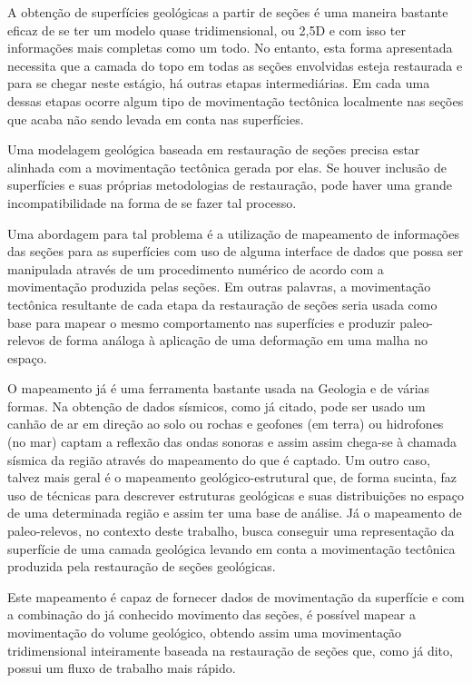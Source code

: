 A obtenção de superfícies geológicas a partir de seções é uma maneira bastante eficaz de se ter um modelo quase tridimensional, ou 2,5D e com isso ter informações mais completas como um todo. No entanto, esta forma apresentada necessita que a camada do topo em todas as seções envolvidas esteja restaurada e para se chegar neste estágio, há outras etapas intermediárias. Em cada uma dessas etapas ocorre algum tipo de movimentação tectônica localmente nas seções que acaba não sendo levada em conta nas superfícies.

Uma modelagem geológica baseada em restauração de seções precisa estar alinhada com a movimentação tectônica gerada por elas. Se houver inclusão de superfícies e suas próprias metodologias de restauração, pode haver uma grande incompatibilidade na forma de se fazer tal processo.

Uma abordagem para tal problema é a utilização de mapeamento de informações das seções para as superfícies com uso de alguma interface de dados que possa ser manipulada através de um procedimento numérico de acordo com a movimentação produzida pelas seções. Em outras palavras, a movimentação tectônica resultante de cada etapa da restauração de seções seria usada como base para mapear o mesmo comportamento nas superfícies e produzir paleo-relevos de forma análoga à aplicação de uma deformação em uma malha no espaço.

O mapeamento já é uma ferramenta bastante usada na Geologia e de várias formas. Na obtenção de dados sísmicos, como já citado, pode ser usado um canhão de ar em direção ao solo ou rochas e geofones (em terra) ou hidrofones (no mar) captam a reflexão das ondas sonoras e assim assim chega-se à chamada sísmica da região através do mapeamento do que é captado.\cite{Fossen} Um outro caso, talvez mais geral é o mapeamento geológico-estrutural que, de forma sucinta, faz uso de técnicas para descrever estruturas geológicas e suas distribuições no espaço de uma determinada região e assim ter uma base de análise.\cite{Borges, Felipe} Já o mapeamento de paleo-relevos, no contexto deste trabalho, busca conseguir uma representação da superfície de uma camada geológica levando em conta a movimentação tectônica produzida pela restauração de seções geológicas.

Este mapeamento é capaz de fornecer dados de movimentação da superfície e com a combinação do já conhecido movimento das seções, é possível mapear a movimentação do volume geológico, obtendo assim uma movimentação tridimensional inteiramente baseada na restauração de seções que, como já dito, possui um fluxo de trabalho mais rápido.

